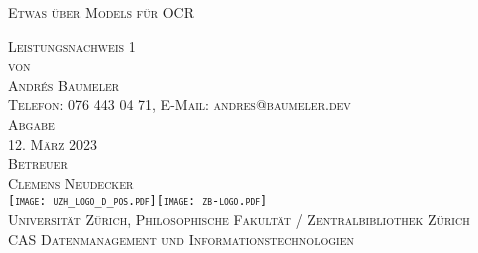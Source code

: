 

\begin{titlepage}

\begin{center}
\Large
\textsc{Etwas über Models für OCR}\\

\vspace{4cm}

\textsc{Leistungsnachweis 1\\[0.5\baselineskip]
 von\\[0.5\baselineskip]
Andrés Baumeler\\
{\normalsize \textsc{Telefon: 076 443 04 71, E-Mail: andres@baumeler.dev }}}\\

\vspace{3cm}
\textsc{Abgabe} \\
\textsc{12. März 2023}\\ %

\vspace{1cm}
\textsc{Betreuer\\
Clemens Neudecker}\\

\vspace{2cm}
\textsc{ \texttt{[image: uzh\_logo\_d\_pos.pdf]}\hspace{1cm}\texttt{[image: zb-logo.pdf]} \\
Universität Zürich, Philosophische Fakultät  / Zentralbibliothek Zürich\\
\normalsize{CAS Datenmanagement und Informationstechnologien}}\\

\end{center}

\end{titlepage}
